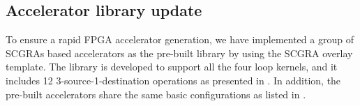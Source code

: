 \begin{table}
\footnotesize
\centering
\caption{QuickDough unrolling setup \label{tab:unrolling-setup}}{
}
\end{table}

\subsection{Accelerator library update} \label{subsec:lib-update}
To ensure a rapid FPGA accelerator generation, we have implemented a group of 
SCGRAs based accelerators as the pre-built library by using the SCGRA overlay template. 
The library is developed to support all the four loop kernels, and it includes 12 
3-source-1-destination operations as presented in . In addition, 
the pre-built accelerators share the same basic configurations as listed in 
.  

